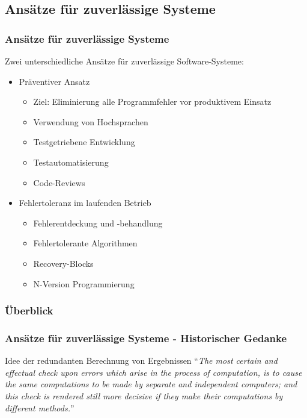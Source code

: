 \subsection{Ansätze für zuverlässige Systeme}
%
\begin{frame}
	\frametitle{Ansätze für zuverlässige Systeme}
	Zwei unterschiedliche Ansätze für zuverlässige Software-Systeme:
		
		\begin{itemize}
			\pause
			\item Präventiver Ansatz
			\begin{itemize}
				\item Ziel: Eliminierung alle Programmfehler vor produktivem Einsatz
				\item Verwendung von Hochsprachen
				\item Testgetriebene Entwicklung
				\item Testautomatisierung				
				\item Code-Reviews
			\end{itemize}
			\pause	
			\item Fehlertoleranz im laufenden Betrieb	
			\begin{itemize}
				\item Fehlerentdeckung und -behandlung
				\item Fehlertolerante Algorithmen
				\item Recovery-Blocks
				\item N-Version Programmierung
			\end{itemize}
			
		\end{itemize}	
\end{frame}
%
%
\begin{frame}
	\frametitle{Überblick}
	\tableofcontents[currentsubsection]
\end{frame}
%
%
\begin{frame}
	\frametitle{Ansätze für zuverlässige Systeme - Historischer Gedanke}
	\begin{block}{Idee der redundanten Berechnung von Ergebnissen \cite{lardner}}
		\enquote{\emph{The most certain and effectual check upon errors which arise in the process of computation,	is to cause the same computations to be made by separate and independent computers; and this	check is rendered still more decisive if they make their computations by different methods.}}
	\end{block}
\end{frame}
%
%
